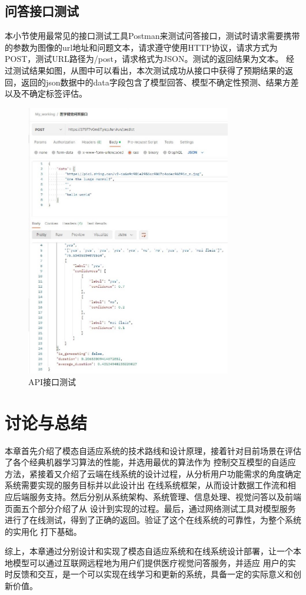 \subsection{问答接口测试}
本小节使用最常见的接口测试工具Postman来测试问答接口，测试时请求需要携带的参数为图像的url地址和问题文本，请求遵守使用HTTP协议，请求方式为POST，测试URL路径为/post，请求格式为JSON。测试的返回结果为文本。
经过测试结果如图，从图中可以看出，本次测试成功从接口中获得了预期结果的返回，返回的json数据中的data字段包含了模型回答、模型不确定性预测、结果方差以及不确定标签评估。
\begin{figure}[htbp]
	\centering	
	\includegraphics[width=0.8\textwidth]{Fig/myfig/chapter5/sys_apitest2.jpg}  %
	\caption{\label{sys_apitest}API接口测试} 
\end{figure}

\section{讨论与总结}
本章首先介绍了模态自适应系统的技术路线和设计原理，接着针对目前场景在评估了各个经典机器学习算法的性能，并选用最优的算法作为
控制交互模型的自适应方法，紧接着又介绍了云端在线系统的设计过程，从分析用户功能需求的角度确定系统需要实现的服务目标并以此设计出
在线系统框架，从而设计数据工作流和相应后端服务支持。然后分别从系统架构、系统管理、信息处理、视觉问答以及前端页面五个部分介绍了从
设计到实现的过程。最后，通过网络测试工具对模型服务进行了在线测试，得到了正确的返回。验证了这个在线系统的可靠性，为整个系统的实用化
打下基础。

综上，本章通过分别设计和实现了模态自适应系统和在线系统设计部署，让一个本地模型可以通过互联网远程地为用户们提供医疗视觉问答服务，并适应
用户的实时反馈和交互，是一个可以实现在线学习和更新的系统，具备一定的实际意义和创新价值。














